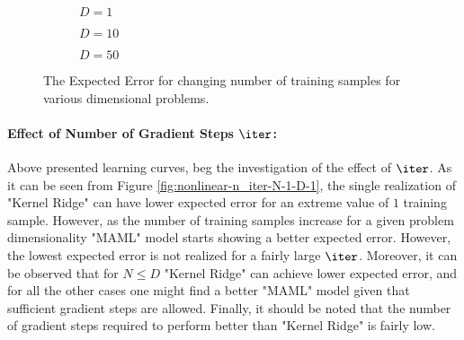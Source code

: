 \begin{figure}[!h]
  \centering
    \begin{subfigure}{0.3\textwidth}
      \centering
      \caption{$D=1$}
      \label{fig:nonlinear-N-D-1}
    \end{subfigure}
    \begin{subfigure}{0.3\textwidth}
      \centering
      \caption{$D=10$}
      \label{fig:nonlinear-N-D-10}
    \end{subfigure}
    \begin{subfigure}{0.3\textwidth}
      \centering
      \caption{$D=50$}
      \label{fig:nonlinear-N-D-50}
    \end{subfigure}
  \caption{The Expected Error for changing number of training samples for various dimensional problems.}\label{ref:nonlinear-N}
\end{figure}


\paragraph{Effect of Number of Gradient Steps $\iter$:} Above presented learning curves, beg the investigation of the effect of $\iter$.  As it can be seen from Figure \ref{fig:nonlinear-n_iter-N-1-D-1}, the single realization of "Kernel Ridge" can have lower expected error for an extreme value of $1$ training sample. However, as the number of training samples increase for a given problem dimensionality "MAML" model starts showing a better expected error. However, the lowest expected error is not realized for a fairly large $\iter$. Moreover, it can be observed that for $N\leq D$ "Kernel Ridge" can achieve lower expected error, and for all the other cases one might find a better "MAML" model given that sufficient gradient steps are allowed. Finally, it should be noted that the number of gradient steps required to perform better than "Kernel Ridge" is fairly low.

